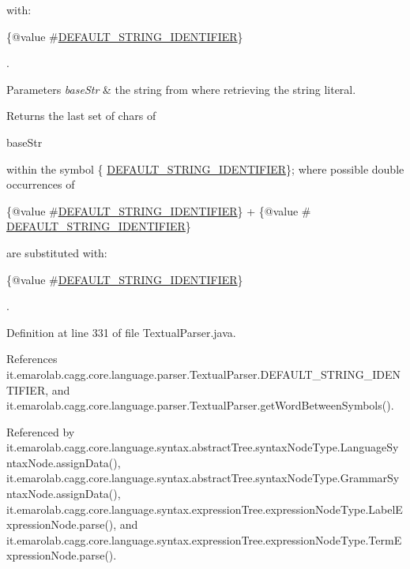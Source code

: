  with\-:
\begin{DoxyCode}
\{@value #\hyperlink{classit_1_1emarolab_1_1cagg_1_1core_1_1language_1_1parser_1_1TextualParser_aec543b552ded4668a73c7b2bf5b9301d}{DEFAULT\_STRING\_IDENTIFIER}\} 
\end{DoxyCode}
 . 
\begin{DoxyParams}{Parameters}
{\em base\-Str} & the string from where retrieving the string literal. \\
\hline
\end{DoxyParams}
\begin{DoxyReturn}{Returns}
the last set of chars of
\begin{DoxyCode}
baseStr 
\end{DoxyCode}
 within the symbol \{ \hyperlink{classit_1_1emarolab_1_1cagg_1_1core_1_1language_1_1parser_1_1TextualParser_aec543b552ded4668a73c7b2bf5b9301d}{D\-E\-F\-A\-U\-L\-T\-\_\-\-S\-T\-R\-I\-N\-G\-\_\-\-I\-D\-E\-N\-T\-I\-F\-I\-E\-R}\}; where possible double occurrences of
\begin{DoxyCode}
\{@value #\hyperlink{classit_1_1emarolab_1_1cagg_1_1core_1_1language_1_1parser_1_1TextualParser_aec543b552ded4668a73c7b2bf5b9301d}{DEFAULT\_STRING\_IDENTIFIER}\} + \{@value #
      \hyperlink{classit_1_1emarolab_1_1cagg_1_1core_1_1language_1_1parser_1_1TextualParser_aec543b552ded4668a73c7b2bf5b9301d}{DEFAULT\_STRING\_IDENTIFIER}\} 
\end{DoxyCode}
 are substituted with\-:
\begin{DoxyCode}
\{@value #\hyperlink{classit_1_1emarolab_1_1cagg_1_1core_1_1language_1_1parser_1_1TextualParser_aec543b552ded4668a73c7b2bf5b9301d}{DEFAULT\_STRING\_IDENTIFIER}\} 
\end{DoxyCode}
 . 
\end{DoxyReturn}


Definition at line 331 of file Textual\-Parser.\-java.



References it.\-emarolab.\-cagg.\-core.\-language.\-parser.\-Textual\-Parser.\-D\-E\-F\-A\-U\-L\-T\-\_\-\-S\-T\-R\-I\-N\-G\-\_\-\-I\-D\-E\-N\-T\-I\-F\-I\-E\-R, and it.\-emarolab.\-cagg.\-core.\-language.\-parser.\-Textual\-Parser.\-get\-Word\-Between\-Symbols().



Referenced by it.\-emarolab.\-cagg.\-core.\-language.\-syntax.\-abstract\-Tree.\-syntax\-Node\-Type.\-Language\-Syntax\-Node.\-assign\-Data(), it.\-emarolab.\-cagg.\-core.\-language.\-syntax.\-abstract\-Tree.\-syntax\-Node\-Type.\-Grammar\-Syntax\-Node.\-assign\-Data(), it.\-emarolab.\-cagg.\-core.\-language.\-syntax.\-expression\-Tree.\-expression\-Node\-Type.\-Label\-Expression\-Node.\-parse(), and it.\-emarolab.\-cagg.\-core.\-language.\-syntax.\-expression\-Tree.\-expression\-Node\-Type.\-Term\-Expression\-Node.\-parse().



